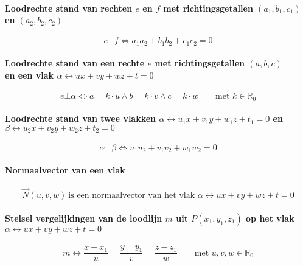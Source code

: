 \paragraph{Loodrechte stand van rechten $e$ en $f$ met richtingsgetallen $\left(a_1,b_1,c_1\right)$ en $\left(a_2,b_2,c_2\right)$}
\label{sec:LoodrechteStandRechten}
   \[
     e \bot f \Leftrightarrow a_1 a_2 + b_1 b_2 + c_1 c_2 = 0
   \]  
   
\paragraph{Loodrechte stand van een rechte $e$ met richtingsgetallen $\left(a,b,c\right)$\\ en een vlak $\alpha \leftrightarrow ux + vy + wz + t = 0$}
\label{sec:LoodrechteStandVanEenRechteEMetRichtingsgetallenLeftABCRightEnEenVlakAlphaLeftrightarrowUxVyWzT0}
   \[
     e \bot \alpha \Leftrightarrow 
                    a = k \cdot u \wedge b = k \cdot v \wedge c = k \cdot w 
                    \qquad \textrm{met } k \in \mathbb{R}_0
   \] 
   
\paragraph{Loodrechte stand van twee vlakken $\alpha \leftrightarrow u_1 x + v_1 y + w_1 z + t_1 = 0$ 
                                           en $\beta \leftrightarrow u_2 x + v_2 y + w_2 z + t_2 = 0$}
\label{sec:LoodrechteStandVlakken}
   \[
     \alpha \bot \beta \Leftrightarrow 
                    u_1 u_2 + v_1 v_2 + w_1 w_2 = 0
   \]
   
\paragraph{Normaalvector van een vlak}
\label{sec:NormaalvectorVlak}
   \[
    \vec N\left(u,v,w\right) \ \textrm{is een normaalvector van het vlak } \alpha \leftrightarrow ux + vy + wz + t = 0
   \]  
    
\paragraph{Stelsel vergelijkingen van de loodlijn $m$ uit $P\left(x_1,y_1,z_1\right)$ op het vlak $\alpha \leftrightarrow ux + vy + wz + t = 0$}
\label{sec:LoodlijnPuntVlak}
   \[
     m \leftrightarrow \frac{x-x_1}{u} = \frac{y-y_1}{v} = \frac{z-z_1}{w} \qquad \textrm{met } u, v,w \in \mathbb{R}_0
   \]
   
